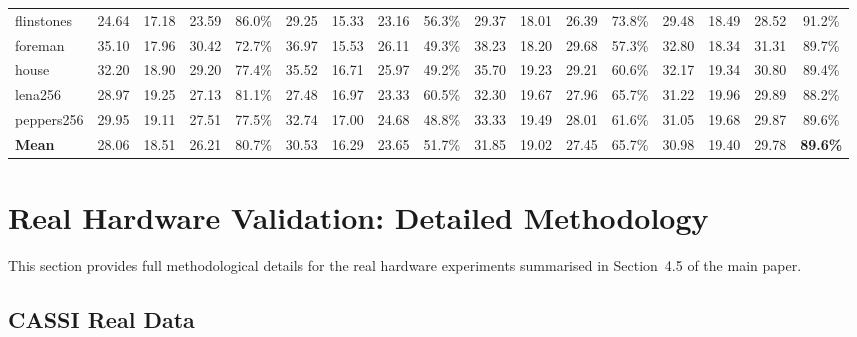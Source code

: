 \documentclass[runningheads]{llncs}
\newcommand{\best}[1]{\textbf{#1}}
\begin{document}
\begin{table}[h]
{\begin{tabular}{@{}l|ccc|c|ccc|c|ccc|c|ccc|c@{}}
flinstones  & 24.64 & 17.18 & 23.59 & 86.0\% & 29.25 & 15.33 & 23.16 & 56.3\% & 29.37 & 18.01 & 26.39 & 73.8\% & 29.48 & 18.49 & 28.52 & 91.2\% \\
foreman     & 35.10 & 17.96 & 30.42 & 72.7\% & 36.97 & 15.53 & 26.11 & 49.3\% & 38.23 & 18.20 & 29.68 & 57.3\% & 32.80 & 18.34 & 31.31 & 89.7\% \\
house       & 32.20 & 18.90 & 29.20 & 77.4\% & 35.52 & 16.71 & 25.97 & 49.2\% & 35.70 & 19.23 & 29.21 & 60.6\% & 32.17 & 19.34 & 30.80 & 89.4\% \\
lena256     & 28.97 & 19.25 & 27.13 & 81.1\% & 27.48 & 16.97 & 23.33 & 60.5\% & 32.30 & 19.67 & 27.96 & 65.7\% & 31.22 & 19.96 & 29.89 & 88.2\% \\
peppers256  & 29.95 & 19.11 & 27.51 & 77.5\% & 32.74 & 17.00 & 24.68 & 48.8\% & 33.33 & 19.49 & 28.01 & 61.6\% & 31.05 & 19.68 & 29.87 & 89.6\% \\
\midrule
\textbf{Mean} & 28.06 & 18.51 & 26.21 & 80.7\% & 30.53 & 16.29 & 23.65 & 51.7\% & 31.85 & 19.02 & 27.45 & 65.7\% & 30.98 & 19.40 & 29.78 & \best{89.6\%} \\
\bottomrule
\end{tabular}%
}
\end{table}

\section{Real Hardware Validation: Detailed Methodology}
\label{sec:real_perscene}

This section provides full methodological details for the real hardware experiments summarised in Section~4.5 of the main paper.

\subsection{CASSI Real Data}
\end{document}
